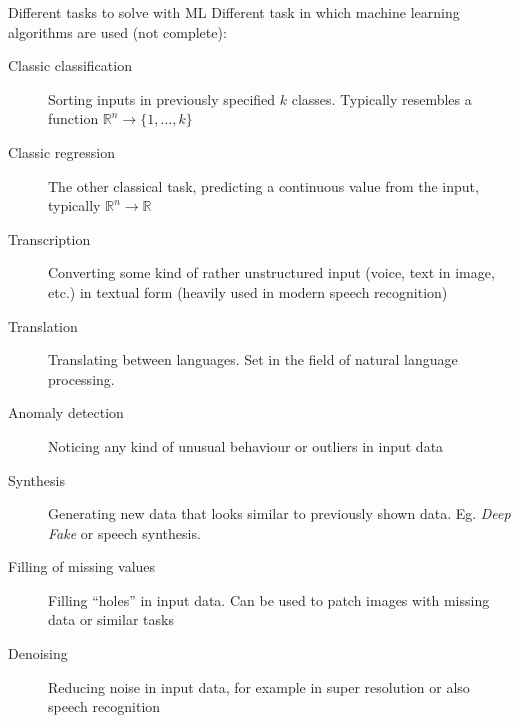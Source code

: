   \begin{frame}{Different tasks to solve with ML}
    Different task in which machine learning algorithms are used (not complete):
    \begin{description}
      \item [Classic classiﬁcation] Sorting inputs in previously specified $k$ classes.
        Typically resembles a function $\mathbb{R}^n \rightarrow \{1, \dots, k\}$
      \item [Classic regression] The other classical task, predicting a continuous value from the input, typically $\mathbb{R}^n \rightarrow \mathbb{R}$
      \item [Transcription] Converting some kind of rather unstructured input (voice, text in image, etc.) in textual form (heavily used in modern speech recognition)
      \item [Translation] Translating between languages.
        Set in the field of natural language processing.
      \item [Anomaly detection] Noticing any kind of unusual behaviour or outliers in input data
      \item [Synthesis] Generating new data that looks similar to previously shown data.
        Eg. \emph{Deep Fake} or speech synthesis.
      \item [Filling of missing values] Filling \enquote{holes} in input data.
        Can be used to patch images with missing data or similar tasks
      \item [Denoising] Reducing noise in input data, for example in super resolution or also speech recognition
    \end{description}
  \end{frame}

